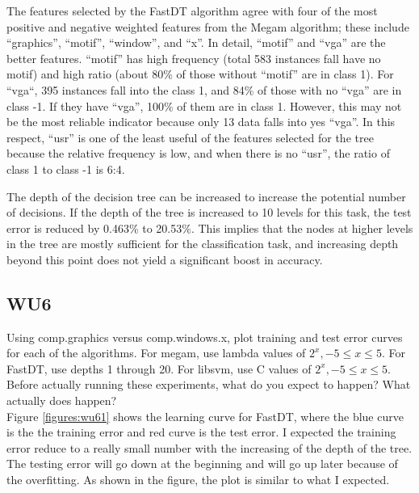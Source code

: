 \documentclass[a4paper,11pt]{article}
\begin{document}
The features selected by the FastDT algorithm agree with four of the most
positive and negative weighted features from the Megam algorithm; these 
include ``graphics'', ``motif'', ``window'', and ``x''. In detail, 
``motif'' and ``vga'' are the better features. ``motif'' has high frequency
(total 583 instances fall have no motif) and high ratio (about 80\% of
those without ``motif'' are in class 1). For ``vga``,  395 instances fall into
the class 1, and 84\% of those with no ``vga'' are in class -1. If they
have ``vga'', 100\% of them are in class 1. However, this may not be the
most reliable indicator because only 13 data falls into yes ``vga''.
In this respect, ``usr'' is one of the least useful of the features selected
for the tree because the relative frequency is low, and when there is no ``usr'',
the ratio of class 1 to class -1 is 6:4.

The depth of the decision tree can be increased to increase the potential number
of decisions. If the depth of the tree is increased to 10 levels for this task,
the test error is reduced by 0.463\% to 20.53\%. This implies that the nodes at higher
levels in the tree are mostly sufficient for the classification task, and increasing
depth beyond this point does not yield a significant boost in accuracy.

\subsection{WU6}
\textsf{Using comp.graphics versus comp.windows.x, plot training 
and test error curves for each of the algorithms. 
For megam, use lambda values of $2^x, -5 \leq x \leq 5$. 
For FastDT, use depths 1 through 20. 
For libsvm, use C values of $2^x,  -5 \leq x \leq 5$. 
Before actually running these experiments, what do you expect to happen? 
What actually does happen?}\\

Figure \ref{figures:wu61} shows the learning curve for FastDT, 
where the blue curve is the the training error and red curve 
is the test error. I expected the training error reduce to a 
really small number with the increasing of the depth of the tree. 
The testing error will go down at the beginning and will go up 
later because of the overfitting. As shown in the figure, the 
plot is similar to what I expected.
\end{document}
